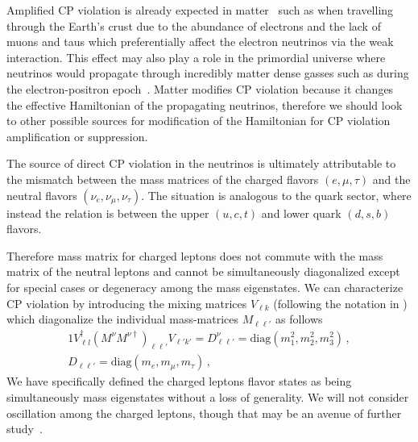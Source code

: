 Amplified CP violation is already expected in matter~\citep{Harrison:1999df} such as when travelling through the Earth's crust due to the abundance of electrons and the lack of muons and taus which preferentially affect the electron neutrinos via the weak interaction. This effect may also play a role in the primordial universe where neutrinos would propagate through incredibly matter dense gasses such as during the electron-positron epoch~\citep{Rafelski:2023emw}. Matter modifies CP violation because it changes the effective Hamiltonian of the propagating neutrinos, therefore we should look to other possible sources for modification of the Hamiltonian for CP violation amplification or suppression.

The source of direct CP violation in the neutrinos is ultimately attributable to the mismatch between the mass matrices of the charged flavors $(e,\mu,\tau)$ and the neutral flavors $(\nu_{e},\nu_{\mu},\nu_{\tau})$. The situation is analogous to the quark sector, where instead the relation is between the upper $(u,c,t)$ and lower quark $(d,s,b)$ flavors.

Therefore mass matrix for charged leptons does not commute with the mass matrix of the neutral leptons and cannot be simultaneously diagonalized except for special cases or degeneracy among the mass eigenstates. We can characterize CP violation by introducing the mixing matrices $V_{\ell k}$ (following the notation in ) which diagonalize the individual mass-matrices $M_{\ell\ell'}$ as follows
\begin{alignat}{1}
	\label{diagj:1}
    V_{\ell l}^{\dag}(M^{\nu}M^{\nu\dag})_{\ell\ell'}V_{\ell'k'} = D_{\ell\ell'}^{\nu} = \mathrm{diag}(m_{1}^{2},m_{2}^{2},m_{3}^{2})\,,\\
    \label{diagj:2}
    D_{\ell\ell'} = \mathrm{diag}(m_{e},m_{\mu},m_{\tau})\,,
\end{alignat}
We have specifically defined the charged leptons flavor states as being simultaneously mass eigenstates without a loss of generality. We will not consider oscillation among the charged leptons, though that may be an avenue of further study~\cite{Akhmedov:2007fk}.

